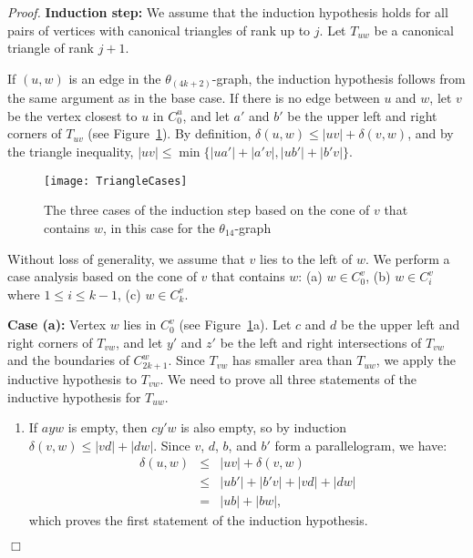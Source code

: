 \documentclass[12pt]{article}
\newenvironment{proof}{\emph{Proof.}}{\hfill $\Box$\\}
\newcommand{\graph}[1]{\ensuremath{\theta_{(4 k + #1)}}-graph\xspace}
\newcommand{\canon}[2]{\ensuremath{T_{#1 #2}}}
\begin{document}
\begin{proof}
  \textbf{Induction step:} We assume that the induction hypothesis holds for all pairs of vertices with canonical triangles of rank up to $j$. Let $\canon{u}{w}$ be a canonical triangle of rank $j+1$.

  If $(u,w)$ is an edge in the \graph{2}, the induction hypothesis follows from the same argument as in the base case. If there is no edge between $u$ and $w$, let $v$ be the vertex closest to $u$ in $C_0^u$, and let $a'$ and $b'$ be the upper left and right corners of $\canon{u}{v}$ (see Figure~\ref{fig:TriangleCases}). By definition, $\delta(u, w) \leq |u v| + \delta(v, w)$, and by the triangle inequality, $|u v| \leq \min\{|u a'| + |a' v|, |u b'| + |b' v|\}$.

  \begin{figure}[ht]
    \begin{center}
      \texttt{[image: TriangleCases]}
    \end{center}
    \caption{The three cases of the induction step based on the cone of $v$ that contains $w$, in this case for the $\theta_{14}$-graph}
    \label{fig:TriangleCases}
  \end{figure}

  Without loss of generality, we assume that $v$ lies to the left of $w$. We perform a case analysis based on the cone of $v$ that contains $w$: (a) $w \in C_0^v$, (b) $w \in C_i^v$ where $1 \leq i \leq k-1$, (c) $w \in C_k^v$. 

  \textbf{Case (a):} Vertex $w$ lies in $C_0^v$ (see Figure~\ref{fig:TriangleCases}a). Let $c$ and $d$ be the upper left and right corners of $\canon{v}{w}$, and let $y'$ and $z'$ be the left and right intersections of $\canon{v}{w}$ and the boundaries of $C_{2k+1}^w$. Since $\canon{v}{w}$ has smaller area than $\canon{u}{w}$, we apply the inductive hypothesis to $\canon{v}{w}$. We need to prove all three statements of the inductive hypothesis for $\canon{u}{w}$.

  \begin{enumerate}
  \item If $a y w$ is empty, then $c y' w$ is also empty, so by induction $\delta(v, w) \leq |v d| + |d w|$. Since $v$, $d$, $b$, and $b'$ form a parallelogram, we have:
  \begin{eqnarray*}
    \delta(u, w) &\leq& |u v| + \delta(v, w) \\
    &\leq& |u b'| + |b' v| + |v d| + |d w| \\
    &=& |u b| + |b w|,
  \end{eqnarray*}
  which proves the first statement of the induction hypothesis.


\end{enumerate}
\end{proof}
\end{document}
